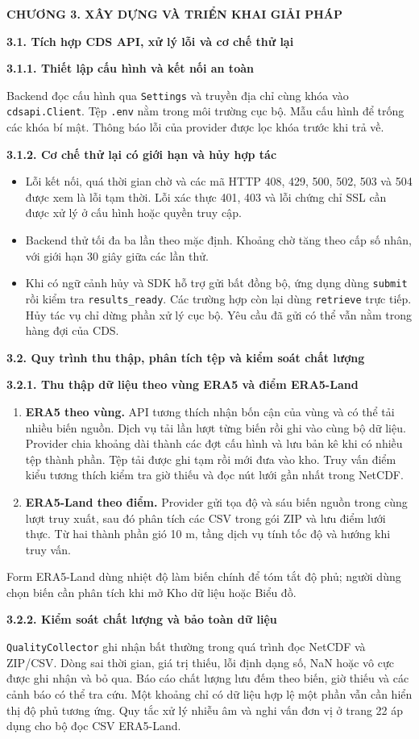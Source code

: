 \documentclass[12pt,a4paper]{article}
\newcommand{\pg}[1]{\newpage\pagenumbering{arabic}\setcounter{page}{#1}\thispagestyle{fancy}}
\newcommand{\heading}[1]{\par\medskip\noindent\textbf{#1}\par\nopagebreak}
\newcommand{\chaptertitle}[1]{\begin{center}\large\bfseries #1\end{center}}
\newcommand{\code}[1]{\texttt{#1}}
\begin{document}
\pg{19}
\chaptertitle{CHƯƠNG 3. XÂY DỰNG VÀ TRIỂN KHAI GIẢI PHÁP}
\heading{3.1. Tích hợp CDS API, xử lý lỗi và cơ chế thử lại}
\heading{3.1.1. Thiết lập cấu hình và kết nối an toàn}
Backend đọc cấu hình qua \code{Settings} và truyền địa chỉ cùng khóa vào \code{cdsapi.Client}. Tệp \code{.env} nằm trong môi trường cục bộ. Mẫu cấu hình để trống các khóa bí mật. Thông báo lỗi của provider được lọc khóa trước khi trả về.
\heading{3.1.2. Cơ chế thử lại có giới hạn và hủy hợp tác}
\begin{itemize}
\item Lỗi kết nối, quá thời gian chờ và các mã HTTP 408, 429, 500, 502, 503 và 504 được xem là lỗi tạm thời. Lỗi xác thực 401, 403 và lỗi chứng chỉ SSL cần được xử lý ở cấu hình hoặc quyền truy cập.
\item Backend thử tối đa ba lần theo mặc định. Khoảng chờ tăng theo cấp số nhân, với giới hạn 30 giây giữa các lần thử.
\item Khi có ngữ cảnh hủy và SDK hỗ trợ gửi bất đồng bộ, ứng dụng dùng \code{submit} rồi kiểm tra \code{results\_ready}. Các trường hợp còn lại dùng \code{retrieve} trực tiếp. Hủy tác vụ chỉ dừng phần xử lý cục bộ. Yêu cầu đã gửi có thể vẫn nằm trong hàng đợi của CDS.
\end{itemize}
\pg{20}
\heading{3.2. Quy trình thu thập, phân tích tệp và kiểm soát chất lượng}
\heading{3.2.1. Thu thập dữ liệu theo vùng ERA5 và điểm ERA5-Land}
\begin{enumerate}
\item \textbf{ERA5 theo vùng.} API tương thích nhận bốn cận của vùng và có thể tải nhiều biến nguồn. Dịch vụ tải lần lượt từng biến rồi ghi vào cùng bộ dữ liệu. Provider chia khoảng dài thành các đợt cấu hình và lưu bản kê khi có nhiều tệp thành phần. Tệp tải được ghi tạm rồi mới đưa vào kho. Truy vấn điểm kiểu tương thích kiểm tra giờ thiếu và đọc nút lưới gần nhất trong NetCDF.
\item \textbf{ERA5-Land theo điểm.} Provider gửi tọa độ và sáu biến nguồn trong cùng lượt truy xuất, sau đó phân tích các CSV trong gói ZIP và lưu điểm lưới thực. Từ hai thành phần gió 10 m, tầng dịch vụ tính tốc độ và hướng khi truy vấn.
\end{enumerate}
Form ERA5-Land dùng nhiệt độ làm biến chính để tóm tắt độ phủ; người dùng chọn biến cần phân tích khi mở Kho dữ liệu hoặc Biểu đồ.
\heading{3.2.2. Kiểm soát chất lượng và bảo toàn dữ liệu}
\code{QualityCollector} ghi nhận bất thường trong quá trình đọc NetCDF và ZIP/CSV. Dòng sai thời gian, giá trị thiếu, lỗi định dạng số, NaN hoặc vô cực được ghi nhận và bỏ qua. Báo cáo chất lượng lưu đếm theo biến, giờ thiếu và các cảnh báo có thể tra cứu. Một khoảng chỉ có dữ liệu hợp lệ một phần vẫn cần hiển thị độ phủ tương ứng. Quy tắc xử lý nhiễu âm và nghi vấn đơn vị ở trang 22 áp dụng cho bộ đọc CSV ERA5-Land.
\end{document}
